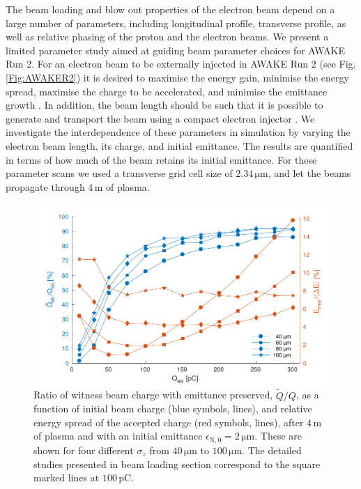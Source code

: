 \documentclass[aps,prstab,reprint,amsmath,amssymb,groupedaddress]{revtex4-1}
\newcommand{\unit}[1]{\,\mathrm{#1}}
\begin{document}
The beam loading and blow out properties of the electron beam depend on a large number of parameters, including
longitudinal profile, transverse profile, as well as relative phasing of the proton and the electron beams. We present a
limited parameter study aimed at guiding beam parameter choices for AWAKE Run 2. For an electron beam to be externally
injected in AWAKE Run 2 (see Fig. \ref{Fig:AWAKER2}) it is desired to maximise the energy gain, minimise the energy
spread, maximise the charge to be accelerated, and minimise the emittance growth \cite{adli:2016}. In addition, the
beam length should be such that it is possible to generate and transport the beam using a compact electron injector
\cite{adli:2016}. We investigate the interdependence of these parameters in simulation by varying the electron beam
length, its charge, and initial emittance. The results are quantified in terms of how much of the beam retains its
initial emittance. For these parameter scans we used a transverse grid cell size of $2.34\unit{\mu m}$, and let the
beams propagate through $4\unit{m}$ of plasma.

\begin{figure}[hbt]
    \includegraphics[width=\linewidth,trim={2mm 0mm 2mm 0mm},clip]{figures/beamQuality}
    \caption{\label{Fig:BeamQ} Ratio of witness beam charge with emittance preserved, $\widetilde{Q}/Q$, as a function
        of initial beam charge (blue symbols, lines), and relative energy spread of the accepted charge (red symbols,
        lines), after $4\unit{m}$ of plasma and with an initial emittance $\epsilon_{\mathrm{N},0}=2\unit{\mu m}$.
        These are shown for four different $\sigma_{z}$ from $40\unit{\mu m}$ to $100\unit{\mu m}$. The detailed studies
        presented in beam loading section correspond to the square marked lines at $100\unit{pC}$.}
\end{figure}
\end{document}

